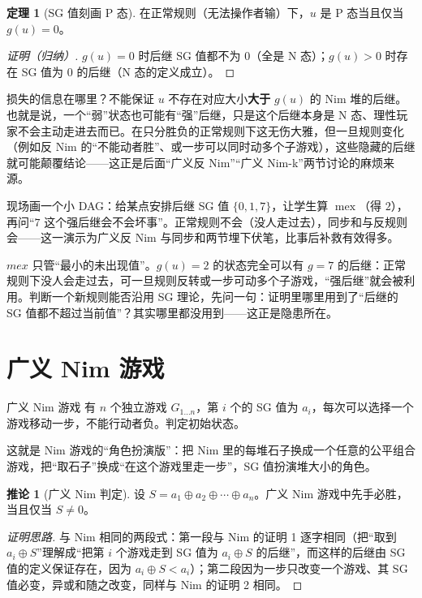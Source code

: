 \documentclass[UTF8,a4paper,11pt,oneside,openany,fontset=fandol]{ctexbook}
\theoremstyle{definition}
\newtheorem{theorem}[definition]{定理}
\newtheorem{corollary}[definition]{推论}
\begin{document}
\begin{theorem}[SG 值刻画 P 态]\label{thm:sgzero}
在正常规则（无法操作者输）下，$u$ 是 P 态当且仅当 $g(u)=0$。
\end{theorem}
\begin{proof}[证明（归纳）]
$g(u)=0$ 时后继 SG 值都不为 $0$（全是 N 态）；$g(u)>0$ 时存在 SG 值为 $0$ 的后继（N 态的定义成立）。
\end{proof}

损失的信息在哪里？不能保证 $u$ 不存在对应大小\textbf{大于} $g(u)$ 的 Nim 堆的后继。也就是说，一个“弱”状态也可能有“强”后继，只是这个后继本身是 N 态、理性玩家不会主动走进去而已。在只分胜负的正常规则下这无伤大雅，但一旦规则变化（例如反 Nim 的“不能动者胜”、或一步可以同时动多个子游戏），这些隐藏的后继就可能颠覆结论——这正是后面“广义反 Nim”“广义 Nim-k”两节讨论的麻烦来源。

\begin{teach}
现场画一个小 DAG：给某点安排后继 SG 值 $\{0,1,7\}$，让学生算 $\operatorname{mex}$（得 $2$），再问“$7$ 这个强后继会不会坏事”。正常规则不会（没人走过去），同步和与反规则会——这一演示为广义反 Nim 与同步和两节埋下伏笔，比事后补救有效得多。
\end{teach}
\begin{pitfall}
$mex$ 只管“最小的未出现值”。$g(u)=2$ 的状态完全可以有 $g=7$ 的后继：正常规则下没人会走过去，可一旦规则反转或一步可动多个子游戏，“强后继”就会被利用。判断一个新规则能否沿用 SG 理论，先问一句：证明里哪里用到了“后继的 SG 值都不超过当前值”？其实哪里都没用到——这正是隐患所在。
\end{pitfall}

\section{广义 Nim 游戏}
\begin{problem}{广义 Nim 游戏}
有 $n$ 个独立游戏 $G_{1\ldots n}$，第 $i$ 个的 SG 值为 $a_i$，每次可以选择一个游戏移动一步，不能行动者负。判定初始状态。
\end{problem}

这就是 Nim 游戏的“角色扮演版”：把 Nim 里的每堆石子换成一个任意的公平组合游戏，把“取石子”换成“在这个游戏里走一步”，SG 值扮演堆大小的角色。

\begin{corollary}[广义 Nim 判定]
设 $S=a_1\oplus a_2\oplus\cdots\oplus a_n$。广义 Nim 游戏中先手必胜，当且仅当 $S\ne0$。
\end{corollary}
\begin{proof}[证明思路]
与 Nim 相同的两段式：第一段与 Nim 的证明 1 逐字相同（把“取到 $a_i\oplus S$”理解成“把第 $i$ 个游戏走到 SG 值为 $a_i\oplus S$ 的后继”，而这样的后继由 SG 值的定义保证存在，因为 $a_i\oplus S<a_i$）；第二段因为一步只改变一个游戏、其 SG 值必变，异或和随之改变，同样与 Nim 的证明 2 相同。
\end{proof}
\end{document}
